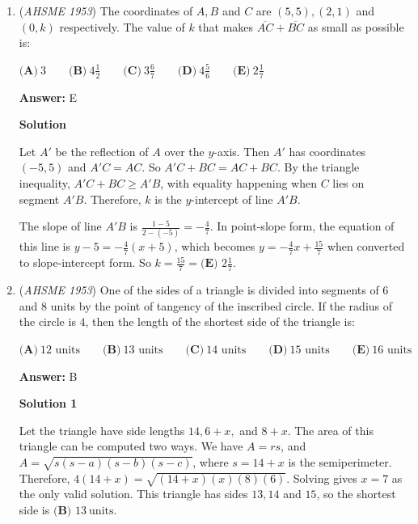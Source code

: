 \begin{enumerate}
 


	\item (\textit{AHSME 1953}) The coordinates of $A,B$ and $C$ are $(5,5),(2,1)$ and $(0,k)$ respectively. 
The value of $k$ that makes $\overline{AC}+\overline{BC}$ as small as possible is: 


 $\textbf{(A)}\ 3 \qquad \textbf{(B)}\ 4\frac{1}{2} \qquad \textbf{(C)}\ 3\frac{6}{7} \qquad \textbf{(D)}\ 4\frac{5}{6}\qquad \textbf{(E)}\ 2\frac{1}{7}$

 \textbf{Answer: }E



\textbf{Solution}

Let $A'$ be the reflection of $A$ over the $y$-axis. Then $A'$ has coordinates $(-5,5)$ and $A'C = AC$.  So $A'C+BC=AC+BC$. By the triangle inequality, $A'C+BC \geq A'B$, with equality happening when $C$ lies on segment ${A'B}$.  Therefore, $k$ is the $y$-intercept of line $A'B$.  

 The slope of line $A'B$ is $\frac{1-5}{2-(-5)}=-\frac {4}{7}$. In point-slope form, the equation of this line is $y-5=-\frac {4}{7}(x+5)$, which becomes $y = -\frac{4}{7}x + \frac{15}{7}$ when converted to slope-intercept form.  So $k = \frac{15}{7} = \boxed{\textbf{(E) } 2\frac17}.$



	\item (\textit{AHSME 1953}) One of the sides of a triangle is divided into segments of $6$ and $8$ units by the point of tangency of the inscribed circle. 
If the radius of the circle is $4$, then the length of the shortest side of the triangle is: 


 $\textbf{(A)}\ 12\text{ units} \qquad \textbf{(B)}\ 13\text{ units} \qquad \textbf{(C)}\ 14\text{ units} \qquad \textbf{(D)}\ 15\text{ units}\qquad \textbf{(E)}\ 16\text{ units}$

 \textbf{Answer: }B



\textbf{Solution 1}

Let the triangle have side lengths $14, 6+x,$ and $8+x$. The area of this triangle can be computed two ways. We have $A = rs$, and $A = \sqrt{s(s-a)(s-b)(s-c)}$, where $s = 14+x$ is the semiperimeter. Therefore, $4(14+x)=\sqrt{(14+x)(x)(8)(6)}$. Solving gives $x = 7$ as the only valid solution. This triangle has sides $13,14$ and $15$, so the shortest side is $\boxed{\textbf{(B) \ } 13 \mathrm{\ units}}$.

 




\end{enumerate}

